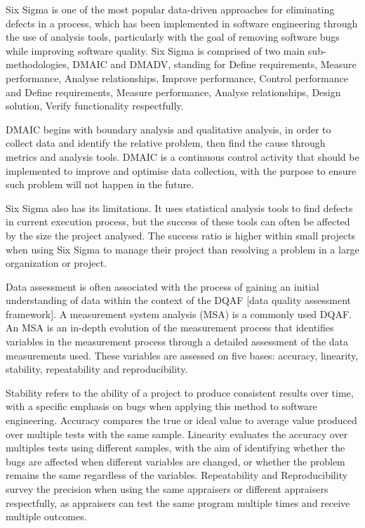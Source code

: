 \documentclass{article}
\begin{document}
Six Sigma is one of the most popular data-driven approaches for eliminating defects in a process, which has been implemented in software engineering through the use of analysis tools, particularly with the goal of removing software bugs while improving software quality. Six Sigma is comprised of two main sub-methodologies, DMAIC and DMADV, standing for Define requirements, Measure performance, Analyse relationships, Improve performance, Control performance and Define requirements, Measure performance, Analyse relationships, Design solution, Verify functionality respectfully. \newline

DMAIC begins with boundary analysis and qualitative analysis, in order to collect data and identify the relative problem, then find the cause through metrics and analysis tools. DMAIC is a continuous control activity that should be implemented to improve and optimise data collection, with the purpose to ensure such problem will not happen in the future. \newline

Six Sigma also has its limitations. It uses statistical analysis tools to find defects in current execution process, but the success of these tools can often be affected by the size the project analysed. The success ratio is higher within small projects when using Six Sigma to manage their project than resolving a problem in a large organization or project. \newline

Data assessment is often associated with the process of gaining an initial understanding of data within the context of the DQAF [data quality assessment framework]. A measurement system analysis (MSA) is a commonly used DQAF. An MSA is an in-depth evolution of the measurement process that identifies variables in the measurement process through a detailed assessment of the data measurements used. These variables are assessed on five bases: accuracy, linearity, stability, repeatability and reproducibility. \newline

Stability refers to the ability of a project to produce consistent results over time, with a specific emphasis on bugs when applying this method to software engineering. Accuracy compares the true or ideal value to average value produced over multiple tests with the same sample. Linearity evaluates the accuracy over multiples tests using different samples, with the aim of identifying whether the bugs are affected when different variables are changed, or whether the problem remains the same regardless of the variables. Repeatability and Reproducibility survey the precision when using the same appraisers or different appraisers respectfully, as appraisers can test the same program multiple times and receive multiple outcomes. \newline
\end{document}
